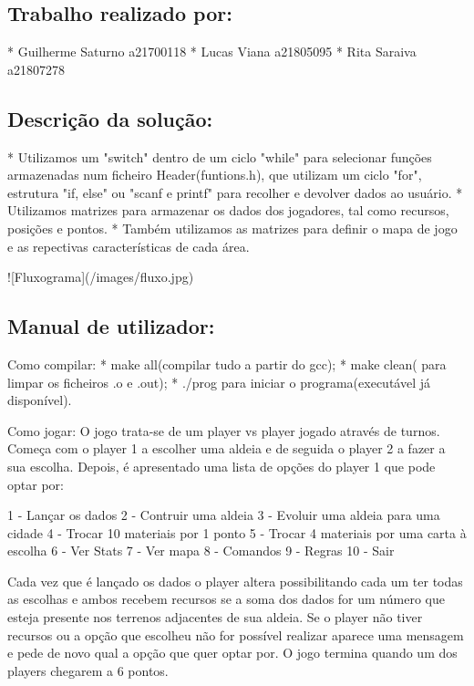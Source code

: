 \subsection*{Trabalho realizado por\+:}

\begin{DoxyVerb}* Guilherme Saturno a21700118
* Lucas Viana a21805095
* Rita Saraiva a21807278
\end{DoxyVerb}


\subsection*{Descrição da solução\+:}

\begin{DoxyVerb}* Utilizamos um "switch" dentro de um ciclo "while" para selecionar funções armazenadas num ficheiro Header(funtions.h), que utilizam um ciclo "for", estrutura "if, else" ou "scanf e printf" para recolher e devolver dados ao usuário.
* Utilizamos matrizes para armazenar os dados dos jogadores, tal como recursos, posições e pontos.
* Também utilizamos as matrizes para definir o mapa de jogo e as repectivas características de cada área.

![Fluxograma](/images/fluxo.jpg)
\end{DoxyVerb}


\subsection*{Manual de utilizador\+:}

\begin{DoxyVerb}Como compilar: 
    * make all(compilar tudo a partir do gcc);
    * make clean( para limpar os ficheiros .o e .out);
    * ./prog para iniciar o programa(executável já disponível).

Como jogar:
    O jogo trata-se de um player vs player jogado através de turnos. Começa com o player 1 a escolher uma aldeia e de seguida o player 2 a fazer a sua escolha. Depois, é apresentado uma lista de opções do player 1 que pode optar por:

    1 - Lançar os dados
    2 - Contruir uma aldeia
    3 - Evoluir uma aldeia para uma cidade
    4 - Trocar 10 materiais por 1 ponto
    5 - Trocar 4 materiais por uma carta à escolha
    6 - Ver Stats
    7 - Ver mapa
    8 - Comandos
    9 - Regras
    10 - Sair

    Cada vez que é lançado os dados o player altera possibilitando cada um ter todas as escolhas e ambos recebem recursos se a soma dos dados for um número que esteja presente nos terrenos adjacentes de sua aldeia. Se o player não tiver recursos ou a opção que escolheu não for possível realizar aparece uma mensagem e pede de novo qual a opção que quer optar por. O jogo termina quando um dos players chegarem a 6 pontos.
\end{DoxyVerb}


